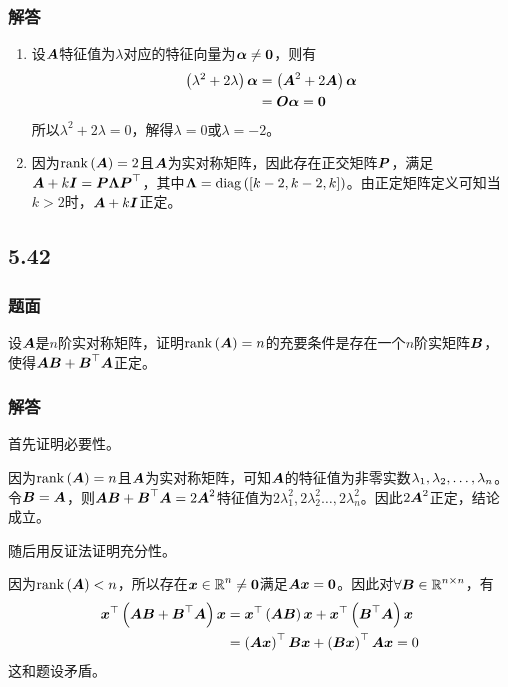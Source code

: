 \documentclass{beamer}
\begin{document}
\begin{frame}
    \frametitle{解答}
    \begin{enumerate}
        \item {
              设\(\mata\)特征值为\(\lambda\)对应的特征向量为\(\vecal\neq\veczero\)，则有
              \begin{align*}
                  \spar{\lambda^2+2\lambda}\vecal & =\spar{\mata^2+2\mata}\vecal \\
                                                  & =\mato\vecal=\veczero
              \end{align*}
              所以\(\lambda^2+2\lambda=0\)，解得\(\lambda=0\)或\(\lambda=-2\)。
              }\pause
        \item {
              因为\(\rank{\mata}=2\)且\(\mata\)为实对称矩阵，因此存在正交矩阵\(\matp\)，满足\(\mata+k\mati=\matp\matlam\matp^\top\)，其中\(\matlam=\diag{\mat{k-2,k-2,k}}\)。由正定矩阵定义可知当\(k>2\)时，\(\mata+k\mati\)正定。
              }
    \end{enumerate}
\end{frame}

\subsection*{5.42}
\begin{frame}
    \frametitle{题面}
    设\(\mata\)是\(n\)阶实对称矩阵，证明\(\rank{\mata}=n\)的充要条件是存在一个\(n\)阶实矩阵\(\matb\)，使得\(\mata\matb+\matb^\top\mata\)正定。
\end{frame}

\begin{frame}
    \frametitle{解答}
    首先证明必要性。

    因为\(\rank{\mata}=n\)且\(\mata\)为实对称矩阵，可知\(\mata\)的特征值为非零实数\(\enums{\lambda}{n}\)。
    令\(\matb=\mata\)，则\(\mata\matb+\matb^\top\mata=2\mata^2\)特征值为\(2\lambda_1^2,2\lambda_2^2\dots,2\lambda_n^2\)。因此\(2\mata^2\)正定，结论成立。
    \pause

    随后用反证法证明充分性。

    因为\(\rank{\mata}<n\)，所以存在\(\vecx\in\rea^n\neq\veczero\)满足\(\mata\vecx=\veczero\)。因此对\(\forall\matb\in\rea^{n\times n}\)，有
    \begin{align*}
        \vecx^\top\spar{\mata\matb+\matb^\top\mata}\vecx & =\vecx^\top\spar{\mata\matb}\vecx+\vecx^\top\spar{\matb^\top\mata}\vecx \\
                                                         & =\spar{\mata\vecx}^\top\matb\vecx+\spar{\matb\vecx}^\top\mata\vecx=0
    \end{align*}
    这和题设矛盾。
\end{frame}
\end{document}
